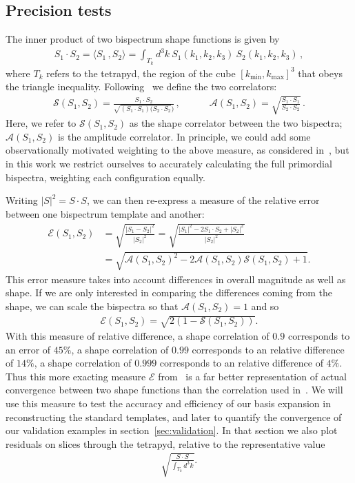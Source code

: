 \documentclass[a4paper,12pt]{extarticle}
\newcommand{\shapecor}{\mathcal{S}}
\newcommand{\ampcor}{\mathcal{A}}
\newcommand{\totalcor}{\mathcal{E}}
\newcommand{\kmin}{{k_\text{min}}}
\newcommand{\kmax}{{k_\text{max}}}
\begin{document}
\subsection{Precision tests}\label{sec:rev_precision_tests}
The inner product of two bispectrum shape functions is given by 
\begin{align}
    S_1\cdot S_2  = \langle S_1\,, S_2 \rangle = \int_{T_k} d^3k \: S_1(k_1,k_2,k_3) \: S_2(k_1,k_2,k_3)\,,\label{inner_prod}
\end{align}
where $T_k$ refers to the tetrapyd, the region of the cube $[\kmin,\kmax]^3$ that obeys the triangle inequality.
Following~\cite{hung_1902}
we define the two correlators:
\begin{align}
    \shapecor(S_1,S_2) = \frac{S_1\cdot S_2}{\sqrt{(S_1\cdot S_1)(S_2\cdot S_2})}\,, \qquad\quad 
\ampcor(S_1,S_2) = \sqrt{\frac{S_1\cdot S_1}{S_2\cdot S_2}}\,.
\end{align}
Here, we refer to $\shapecor(S_1,S_2)$ as the shape correlator between the two bispectra;
$\ampcor(S_1,S_2)$ is the amplitude correlator.
In principle, we could add some observationally motivated weighting
to the above measure, as considered in~\cite{FergShell_1,FergShell_2,FergShell_3},
but in this work we restrict ourselves to accurately calculating the
full primordial bispectra, weighting each configuration equally.

Writing $|S|^2=S\cdot S$,
we can then re-express a measure of the relative error
between one bispectrum template and another:
\begin{align}\label{relative_difference}
\totalcor(S_1,S_2) &= \sqrt{\frac{|S_1-S_2|^2}{|S_2|^2}}  = \sqrt{\frac{|S_1|^2-2S_1\cdot S_2+|S_2|^2}{|S_2|^2}}\nonumber\\
	   &= \sqrt{\ampcor(S_1,S_2)^2-2\ampcor(S_1,S_2)\shapecor(S_1,S_2)+1}.
\end{align}
This error measure takes into account differences in overall magnitude as well as shape.
If we are only interested in comparing the differences coming from the shape,
we can scale the bispectra so that $\ampcor(S_1,S_2)=1$ and so
\begin{align}\label{relative_difference_scaled}
    \totalcor(S_1,S_2) = \sqrt{2(1-\shapecor(S_1,S_2))}.
\end{align}
With this measure of relative difference, a shape correlation of $0.9$ corresponds to an error of $45\%$,
a shape correlation of $0.99$ corresponds to an relative difference of $14\%$,
a shape correlation of $0.999$ corresponds to an relative difference of $4\%$.
Thus this more exacting measure $\totalcor$ from~\cite{hung_1902} is a far better representation of actual convergence  between two shape functions
than the correlation used in~\cite{Funakoshi}.
We will use this measure to test the accuracy and efficiency of our basis expansion
in reconstructing the standard templates, and later to quantify the convergence
of our validation examples in section~\ref{sec:validation}.
In that section we also plot residuals on slices through the tetrapyd,
relative to the representative value
\begin{align}\label{rep_val}
    \sqrt{\frac{S\cdot S}{\int_{T_k} d^3k}}.
\end{align}
\end{document}
